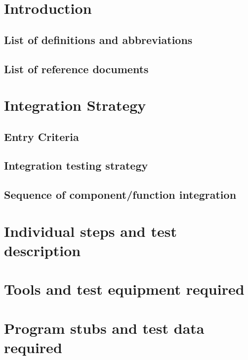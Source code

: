 \documentclass{../Common/Structure/doc_pdf}
\begin{document}
\titleToc

\chapter{Introduction}

\section{List of definitions and abbreviations}

\section{List of reference documents}

\newpage

\chapter{Integration Strategy}
\section{Entry Criteria}

\section{Integration testing strategy}

\section{Sequence of component/function integration}


\chapter{Individual steps and test description}


\chapter{Tools and test equipment required}


\chapter{Program stubs and test data required}

\end{document}

